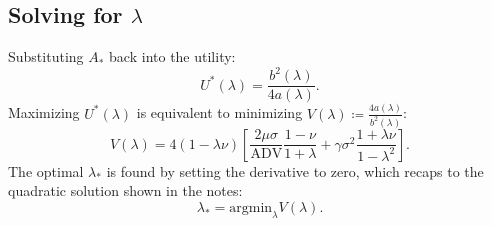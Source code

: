 \documentclass[11pt]{article}
\begin{document}
\subsection{Solving for $\lambda$}
Substituting $A_*$ back into the utility:
\begin{equation}
    U^*(\lambda) = \frac{b^2(\lambda)}{4 a(\lambda)}.
\end{equation}
Maximizing $U^*(\lambda)$ is equivalent to minimizing $V(\lambda) \coloneqq \frac{4 a(\lambda)}{b^2(\lambda)}$:
\begin{equation}
    V(\lambda) = 4(1 - \lambda \nu) \left[ \frac{2 \mu \sigma}{\text{ADV}} \frac{1-\nu}{1+\lambda} + \gamma \sigma^2 \frac{1+\lambda\nu}{1-\lambda^2} \right].
\end{equation}
The optimal $\lambda_*$ is found by setting the derivative to zero, which recaps to the quadratic solution shown in the notes:
\begin{equation}
    \lambda_* = \text{argmin}_\lambda V(\lambda).
\end{equation}
\end{document}
